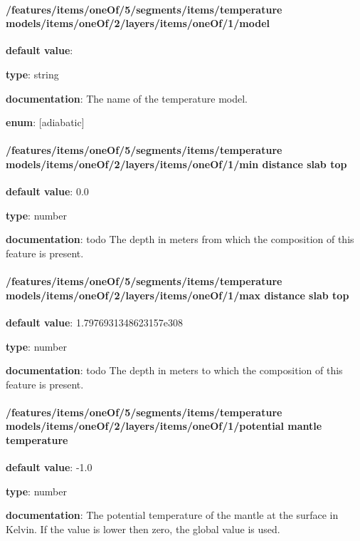 \paragraph{/features/items/oneOf/5/segments/items/temperature models/items/oneOf/2/layers/items/oneOf/1/model} \begin{itemized}
\item {\bf default value}: 
\item {\bf type}: string
\item {\bf documentation}: The name of the temperature model.
\item {\bf enum}: [adiabatic]\end{itemized}\paragraph{/features/items/oneOf/5/segments/items/temperature models/items/oneOf/2/layers/items/oneOf/1/min distance slab top} \begin{itemized}
\item {\bf default value}: 0.0
\item {\bf type}: number
\item {\bf documentation}: todo The depth in meters from which the composition of this feature is present.
\end{itemized}\paragraph{/features/items/oneOf/5/segments/items/temperature models/items/oneOf/2/layers/items/oneOf/1/max distance slab top} \begin{itemized}
\item {\bf default value}: 1.7976931348623157e308
\item {\bf type}: number
\item {\bf documentation}: todo The depth in meters to which the composition of this feature is present.
\end{itemized}\paragraph{/features/items/oneOf/5/segments/items/temperature models/items/oneOf/2/layers/items/oneOf/1/potential mantle temperature} \begin{itemized}
\item {\bf default value}: -1.0
\item {\bf type}: number
\item {\bf documentation}: The potential temperature of the mantle at the surface in Kelvin. If the value is lower then zero, the global value is used.

\end{itemized}
